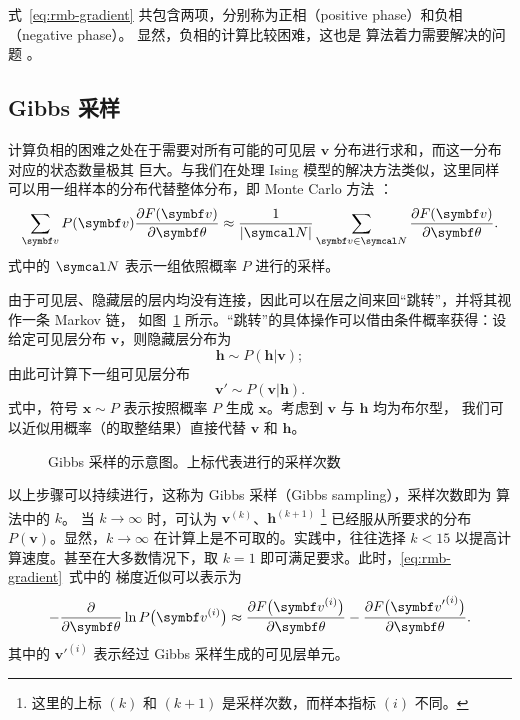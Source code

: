 式~\eqref{eq:rmb-gradient} 共包含两项，分别称为正相（positive phase）和负相（negative phase）。
显然，负相的计算比较困难，这也是 \CDk{} 算法着力需要解决的问题 \cite{rbmonline}。

\subsection{Gibbs 采样}

计算负相的困难之处在于需要对所有可能的可见层 $\bm{v}$ 分布进行求和，而这一分布对应的状态数量极其
巨大。与我们在处理 Ising 模型的解决方法类似，这里同样可以用一组样本的分布代替整体分布，即 Monte
Carlo 方法 \cite{rbmonline}：
\begin{equation}
  \sum_{\bm{v}} P(\bm{v}) \pdv{F(\bm{v})}{\bm{\theta}}
  \approx \frac{1}{\abs{\domN}} \sum_{\bm{v}\in\domN} \pdv{F(\bm{v})}{\bm{\theta}}.
\end{equation}
式中的 $\domN$ 表示一组依照概率 $P$ 进行的采样。

由于可见层、隐藏层的层内均没有连接，因此可以在层之间来回“跳转”，并将其视作一条 Markov 链，
如图~\ref{fig:gibbs-sampling} 所示。“跳转”的具体操作可以借由条件概率获得：设给定可见层分布
$\bm{v}$，则隐藏层分布为
\begin{equation}
  \label{eq:hidden-layer-dist}
  \bm{h} \sim P(\bm{h}\big|\bm{v});
\end{equation}
由此可计算下一组可见层分布
\begin{equation}
  \label{eq:visible-layer-dist}
  \bm{v}' \sim P(\bm{v}\big|\bm{h}).
\end{equation}
式中，符号 $\bm{x}\sim P$ 表示按照概率 $P$ 生成 $\bm{x}$。考虑到 $\bm{v}$ 与 $\bm{h}$ 均为布尔型，
我们可以近似用概率（的取整结果）直接代替 $\bm{v}$ 和 $\bm{h}$。

\begin{figure}[htb]
  \centering
  \caption{Gibbs 采样的示意图。上标代表进行的采样次数}
  \label{fig:gibbs-sampling}
\end{figure}

以上步骤可以持续进行，这称为 Gibbs 采样（Gibbs sampling），采样次数即为 \CDk{} 算法中的 $k$。
当 $k\to\infty$ 时，可认为 $\bm{v}^{(k)}$、$\bm{h}^{(k+1)}$
\footnote{这里的上标 $(k)$ 和 $(k+1)$ 是采样次数，而样本指标 $(i)$ 不同。}
已经服从所要求的分布 $P(\bm{v})$。显然，$k\to\infty$ 在计算上是不可取的。实践中，往往选择 $k<15$
以提高计算速度。甚至在大多数情况下，取 $k=1$ 即可满足要求。此时，\eqref{eq:rmb-gradient}~式中的
梯度近似可以表示为 \cite{rbmonline,hinton2012practical,hinton2002training}
\begin{equation}
  \label{eq:rmb-gradient-approx}
  - \pdv{\bm{\theta}} \ln P\qty\big(\bm{v}^{(i)})
  \approx \pdv{F\qty\big(\bm{v}^{(i)})}{\bm{\theta}}
        - \pdv{F\qty\big({\bm{v}'}^{(i)})}{\bm{\theta}}.
\end{equation}
其中的 ${\bm{v}'}^{(i)}$ 表示经过 Gibbs 采样生成的可见层单元。

